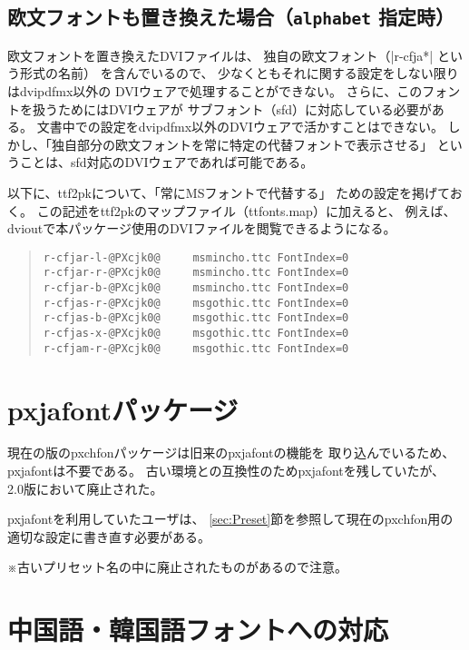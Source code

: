 \documentclass[uplatex,dvipdfmx,a4paper]{jsarticle}
\newcommand{\Pkg}[1]{\textsf{#1}}
\newcommand{\Note}{\par\noindent ※}
\providecommand{\Strong}[1]{\textsf{#1}}
\begin{document}
\subsection{欧文フォントも置き換えた場合（\texttt{alphabet} 指定時）}

欧文フォントを置き換えたDVIファイルは、
独自の欧文フォント（|r-cfja*| という形式の名前）
を含んでいるので、
少なくともそれに関する設定をしない限りはdvipdfmx以外の
DVIウェアで処理することができない。
さらに、このフォントを扱うためにはDVIウェアが
サブフォント（sfd）に対応している必要がある。
文書中での設定をdvipdfmx以外のDVIウェアで活かすことはできない。
しかし、「独自部分の欧文フォントを常に特定の代替フォントで表示させる」
ということは、sfd対応のDVIウェアであれば可能である。

以下に、ttf2pkについて、「常にMSフォントで代替する」
ための設定を掲げておく。
この記述をttf2pkのマップファイル（ttfonts.map）に加えると、
例えば、dvioutで本パッケージ使用のDVIファイルを閲覧できるようになる。

\begin{quote}\small\begin{verbatim}
r-cfjar-l-@PXcjk0@     msmincho.ttc FontIndex=0
r-cfjar-r-@PXcjk0@     msmincho.ttc FontIndex=0
r-cfjar-b-@PXcjk0@     msmincho.ttc FontIndex=0
r-cfjas-r-@PXcjk0@     msgothic.ttc FontIndex=0
r-cfjas-b-@PXcjk0@     msgothic.ttc FontIndex=0
r-cfjas-x-@PXcjk0@     msgothic.ttc FontIndex=0
r-cfjam-r-@PXcjk0@     msgothic.ttc FontIndex=0
\end{verbatim}\end{quote}

\section{pxjafontパッケージ}
\label{sec:Package-pxjafont}

現在の版の\Pkg{pxchfon}パッケージは旧来の\Pkg{pxjafont}の機能を
取り込んでいるため、\Pkg{pxjafont}は不要である。
古い環境との互換性のため\Pkg{pxjafont}を残していたが、
2.0版において\Strong{廃止}された。

\Pkg{pxjafont}を利用していたユーザは、
\ref{sec:Preset}節を参照して現在の\Pkg{pxchfon}用の
適切な設定に書き直す必要がある。
\Note 古いプリセット名の中に廃止されたものがあるので注意。

\section{中国語・韓国語フォントへの対応}
\label{sec:Non-Japanese}
\end{document}
